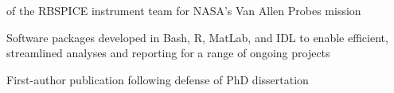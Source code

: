 \begin{itemize*}
    of the RBSPICE instrument team for NASA's Van Allen
    Probes mission  
  \item Software packages developed in Bash, R, MatLab, and IDL to enable efficient, 
    streamlined analyses and reporting for a range of ongoing projects 
  \item First-author publication following defense of PhD dissertation
\end{itemize*}

